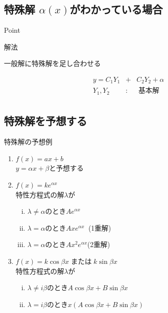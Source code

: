 \documentclass[a4paper]{jsarticle}
\begin{document}
\subsection{特殊解 $\alpha\left(x\right)$がわかっている場合}
\begin{itembox}[l]{Point}
    \begin{center}
    \end{center}
\end{itembox}
\begin{itembox}[l]{解法}
    \begin{center}
        一般解に特殊解を足し合わせる
    \end{center}
    \begin{eqnarray*}
        y=C_1Y_1&+&C_2Y_2+\alpha\\
        Y_1,Y_2\;&:&\;基本解\\
    \end{eqnarray*}
\end{itembox}
\subsection{特殊解を予想する}
\begin{itembox}[l]{特殊解の予想例}
    \begin{enumerate}[(1)]
        \item $f\left(x\right)=ax+b$\\
              $y=\alpha x + \beta$と予想する
        \item $f\left(x\right)=ke^{\alpha x}$\\
              特性方程式の解$\lambda$が
              \begin{enumerate}[(i)]
                  \item $\lambda \neq \alpha$\quad のとき\quad$Ae^{\alpha x}$
                  \item $\lambda = \alpha$\quad のとき\quad$Axe^{\alpha x}\;\;$\quad(1重解)
                  \item $\lambda = \alpha$\quad のとき\quad$Ax^2e^{\alpha x}$\quad(2重解)
              \end{enumerate}
        \item $f\left(x\right)=k\cos\beta x\;$または$\;k\sin\beta x$\\
              特性方程式の解$\lambda$が
              \begin{enumerate}[(i)]
                  \item $\lambda \neq i\beta$\quad のとき\quad$A\cos\beta x+B\sin\beta x$
                  \item $\lambda = i\beta$\quad のとき\quad$x\left(A\cos\beta x+B\sin\beta x\right)$
              \end{enumerate}
    \end{enumerate}
\end{itembox}
\end{document}
